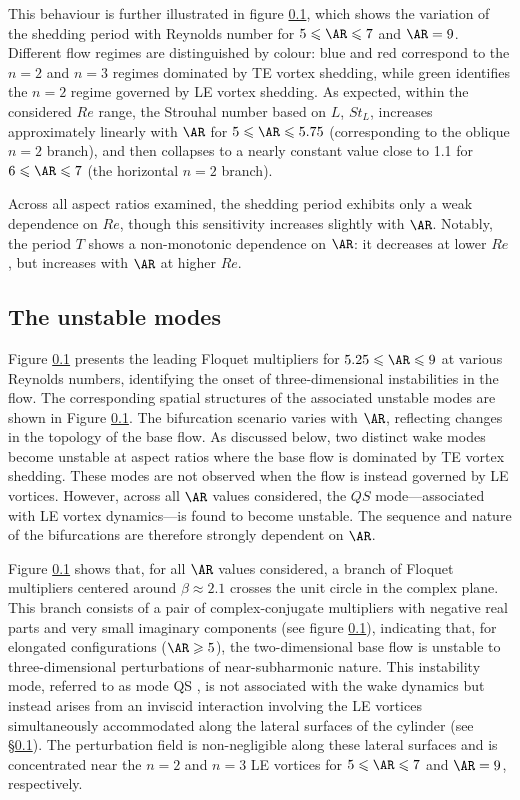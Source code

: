 This behaviour is further illustrated in figure \ref{}, which shows the variation of the shedding period with Reynolds number for $5 \le \AR \le 7$ and $\AR = 9$. Different flow regimes are distinguished by colour: blue and red correspond to the $n = 2$ and $n = 3$ regimes dominated by TE vortex shedding, while green identifies the $n = 2$ regime governed by LE vortex shedding. As expected, within the considered $Re$ range, the Strouhal number based on $L$, $St_L$, increases approximately linearly with $\AR$ for $5 \le \AR \le 5.75$ (corresponding to the oblique $n = 2$ branch), and then collapses to a nearly constant value close to 1.1 for $6 \le \AR \le 7$ (the horizontal $n = 2$ branch).

Across all aspect ratios examined, the shedding period exhibits only a weak dependence on $Re$, though this sensitivity increases slightly with $\AR$. Notably, the period $T$ shows a non-monotonic dependence on $\AR$: it decreases at lower $Re$, but increases with $\AR$ at higher $Re$.

\subsection{The unstable modes}

Figure \ref{} presents the leading Floquet multipliers for $5.25 \le \AR \le 9$ at various Reynolds numbers, identifying the onset of three-dimensional instabilities in the flow. The corresponding spatial structures of the associated unstable modes are shown in Figure \ref{}. The bifurcation scenario varies with $\AR$, reflecting changes in the topology of the base flow. As discussed below, two distinct wake modes become unstable at aspect ratios where the base flow is dominated by TE vortex shedding. These modes are not observed when the flow is instead governed by LE vortices. However, across all $\AR$ values considered, the $QS$ mode---associated with LE vortex dynamics---is found to become unstable. The sequence and nature of the bifurcations are therefore strongly dependent on $\AR$.

Figure \ref{} shows that, for all $\AR$ values considered, a branch of Floquet multipliers centered around $\beta \approx 2.1$ crosses the unit circle in the complex plane. This branch consists of a pair of complex-conjugate multipliers with negative real parts and very small imaginary components (see figure \ref{}), indicating that, for elongated configurations ($\AR \ge 5$), the two-dimensional base flow is unstable to three-dimensional perturbations of near-subharmonic nature. This instability mode, referred to as mode QS \citep{}, is not associated with the wake dynamics but instead arises from an inviscid interaction involving the LE vortices simultaneously accommodated along the lateral surfaces of the cylinder (see \S\ref{}). The perturbation field is non-negligible along these lateral surfaces and is concentrated near the $n=2$ and $n=3$ LE vortices for $5 \le \AR \le 7$ and $\AR = 9$, respectively.


